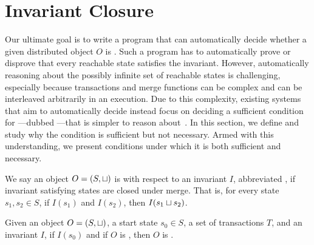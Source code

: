 \section{Invariant Closure}
Our ultimate goal is to write a program that can automatically decide whether a
given distributed object $O$ is \sTIconfluent{}. Such a program has to
automatically prove or disprove that every reachable state satisfies the
invariant. However, automatically reasoning about the possibly infinite set of
reachable states is challenging, especially because transactions and merge
functions can be complex and can be interleaved arbitrarily in an execution.
Due to this complexity, existing systems that aim to automatically decide
\invariantconfluence{} instead focus on deciding a sufficient condition for
\invariantconfluence{}---dubbed ---that is simpler
to reason about~\cite{li2012making, li2014automating}. In this section, we
define \invariantclosure{} and study why the condition is sufficient but not
necessary.  Armed with this understanding, we present conditions under which it
is both sufficient and necessary.

We say an object $O = (S, \sqcup)$ is  with respect
to an invariant $I$, abbreviated , if invariant satisfying
states are closed under merge. That is, for every state $s_1, s_2 \in S$, if
$I(s_1)$ and $I(s_2)$, then $I(s_1 \sqcup s_2)$.

\begin{theorem}
  Given an object $O = (S, \sqcup)$, a start state $s_0 \in S$, a set of
  transactions $T$, and an invariant $I$, if $I(s_0)$ and if $O$ is \Iclosed{},
  then $O$ is \sTIconfluent{}.
\end{theorem}

